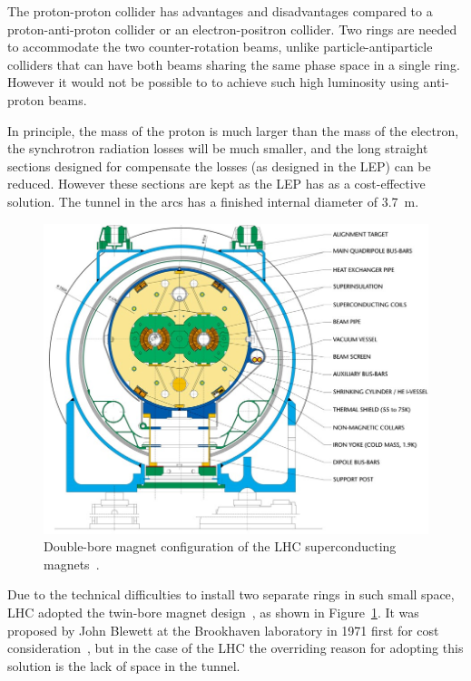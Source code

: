 \documentclass[letterpaper,12pt]{article}
\begin{document}
	The proton-proton collider has advantages 
	and disadvantages compared to a
	proton-anti-proton collider or an electron-positron collider. 
	Two rings are needed to accommodate the two 
	counter-rotation beams, unlike particle-antiparticle 
	colliders that can have both beams sharing the same 
	phase space in a single ring.
	However it would not be possible to to 
	achieve such high luminosity using
	anti-proton beams. 
	
	In principle, the mass of the proton is much larger than 
	the mass of the electron, the
	synchrotron radiation losses will be much smaller, and 
	the long straight sections designed for
	compensate the losses (as designed in the LEP) can be reduced. 
	However these sections are kept 
	as the LEP has as a cost-effective solution. 
	The tunnel in the arcs has a finished internal diameter of 3.7~m. 
		
	\begin{figure}[bht]
		\begin{centering}	
		\includegraphics[width=.7\textwidth]{Detector_plots/LHC-double-bore-magnet.jpg}
		\caption{ Double-bore magnet configuration of the LHC 
		superconducting magnets~\cite{rossi2003lhc}.}
		\label{fig:double-bore-magnet}
		\end{centering}
	\end{figure}

	Due to the technical difficulties to install 
	two separate rings in such small space,
	LHC adopted the twin-bore magnet design~\cite{rossi2003lhc}, 
	as shown in Figure~\ref{fig:double-bore-magnet}.
	It was proposed by John Blewett at the Brookhaven 
	laboratory in 1971 first for
	cost consideration~\cite{Blewett:1971zzb},
	but in the case of the LHC the overriding reason for adopting this solution
	is the lack of space in the tunnel. 
\end{document}
